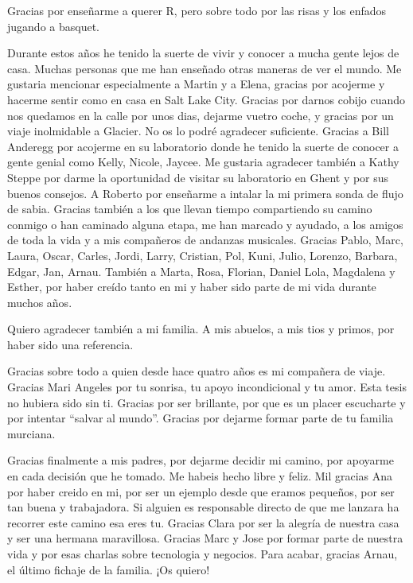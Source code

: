 \documentclass[11pt,twoside]{reedthesis}
\begin{document}
\begin{acknowledgements}
    Gracias por enseñarme a querer R, pero sobre todo por las risas y los
    enfados jugando a basquet.\par
    Durante estos años he tenido la suerte de vivir y conocer a mucha gente
    lejos de casa. Muchas personas que me han enseñado otras maneras de ver
    el mundo. Me gustaria mencionar especialmente a Martin y a Elena,
    gracias por acojerme y hacerme sentir como en casa en Salt Lake City.
    Gracias por darnos cobijo cuando nos quedamos en la calle por unos dias,
    dejarme vuetro coche, y gracias por un viaje inolmidable a Glacier. No
    os lo podré agradecer suficiente. Gracias a Bill Anderegg por acojerme
    en su laboratorio donde he tenido la suerte de conocer a gente genial
    como Kelly, Nicole, Jaycee. Me gustaria agradecer también a Kathy Steppe
    por darme la oportunidad de visitar su laboratorio en Ghent y por sus
    buenos consejos. A Roberto por enseñarme a intalar la mi primera sonda
    de flujo de sabia. Gracias también a los que llevan tiempo compartiendo
    su camino conmigo o han caminado alguna etapa, me han marcado y ayudado,
    a los amigos de toda la vida y a mis compañeros de andanzas musicales.
    Gracias Pablo, Marc, Laura, Oscar, Carles, Jordi, Larry, Cristian, Pol,
    Kuni, Julio, Lorenzo, Barbara, Edgar, Jan, Arnau. También a Marta, Rosa,
    Florian, Daniel Lola, Magdalena y Esther, por haber creído tanto en mi y
    haber sido parte de mi vida durante muchos años.\par
    Quiero agradecer también a mi familia. A mis abuelos, a mis tios y
    primos, por haber sido una referencia.\par
    Gracias sobre todo a quien desde hace quatro años es mi compañera de
    viaje. Gracias Mari Angeles por tu sonrisa, tu apoyo incondicional y tu
    amor. Esta tesis no hubiera sido sin ti. Gracias por ser brillante, por
    que es un placer escucharte y por intentar ``salvar al mundo''. Gracias
    por dejarme formar parte de tu familia murciana.\par
    Gracias finalmente a mis padres, por dejarme decidir mi camino, por
    apoyarme en cada decisión que he tomado. Me habeis hecho libre y feliz.
    Mil gracias Ana por haber creido en mi, por ser un ejemplo desde que
    eramos pequeños, por ser tan buena y trabajadora. Si alguien es
    responsable directo de que me lanzara ha recorrer este camino esa eres
    tu. Gracias Clara por ser la alegría de nuestra casa y ser una hermana
    maravillosa. Gracias Marc y Jose por formar parte de nuestra vida y por
    esas charlas sobre tecnologia y negocios. Para acabar, gracias Arnau, el
    último fichaje de la familia. ¡Os quiero!\par
  \end{acknowledgements}
\end{document}

